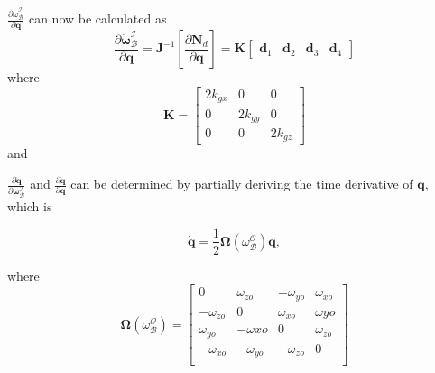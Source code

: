 $\frac{\partial \dot{\omega}_{\mathcal{B}}^{\mathcal{I}}}{\partial \mathbf{q}}$ can now be calculated as
$$
\frac{\partial \dot{\boldsymbol{\omega}}_{\mathcal{B}}^{\mathcal{I}}}{\partial \mathbf{q}}=\mathbf{J}^{-1}\left[\frac{\partial \mathbf{N}_{d}}{\partial \mathbf{q}}\right]=\mathbf{K}\left[\begin{array}{llll}
\mathbf{d}_{1} & \mathbf{d}_{2} & \mathbf{d}_{3} & \mathbf{d}_{4}
\end{array}\right]
$$
where
$$
\mathbf{K}=\left[\begin{array}{ccc}
2 k_{g x} & 0 & 0 \\
0 & 2 k_{g y} & 0 \\
0 & 0 & 2 k_{g z}
\end{array}\right]
$$
and

$\frac{\partial \dot{\mathbf{q}}}{\partial \boldsymbol{\omega}_{\mathcal{B}}^{\mathcal{I}}}$ and $\frac{\partial \dot{\mathbf{q}}}{\partial \mathbf{q}}$ can be determined by partially deriving the time derivative of $\mathbf{q}$, which is

$$\dot{\mathbf{q}} = \frac{1}{2} \boldsymbol{\Omega}(\omega_{\mathcal{B}}^{\mathcal{O}}) \mathbf{q},$$

where $$\boldsymbol{\Omega}(\omega_{\mathcal{B}}^{\mathcal{O}}) = \begin{bmatrix}
	0 & \omega_{zo} & -\omega_{yo} & \omega_{xo} \\
	-\omega_{zo} & 0 & \omega_{xo} & \omega{yo} \\
	\omega_{yo} & -\omega{xo} & 0 & \omega_{zo} \\
	-\omega_{xo} & -\omega_{yo} & -\omega_{zo} & 0 \\
\end{bmatrix}$$

